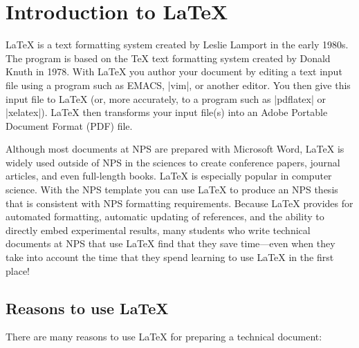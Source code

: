 \chapter{Introduction to \LaTeX}

\LaTeX{} is a text formatting system created by Leslie Lamport in the early
1980s\cite{latex}. The program is based on the \TeX{} text formatting system
created by Donald Knuth in 1978\cite{tex}. 
With \LaTeX{} you author your document
by editing a text input file using a program such as EMACS, |vim|, or another
editor. You then give this input file to \LaTeX{} (or, more accurately, to a
program such as |pdflatex| or |xelatex|). \LaTeX{} then transforms your input
file(s) into an Adobe Portable Document Format (PDF) file.

Although most documents at NPS are prepared with Microsoft\textregistered{}
Word, \LaTeX{} is widely used outside of NPS in the sciences to create
conference papers, journal articles, and even full-length books. \LaTeX{} is
especially popular in computer science. With the NPS template you can use
\LaTeX{} to produce an NPS thesis that is consistent with NPS formatting
requirements. Because \LaTeX{} provides for automated formatting, automatic
updating of references, and the ability to directly embed experimental results,
many students who write technical documents at NPS that use \LaTeX{} find that
they save time---even when they take into account the time that they spend
learning to use \LaTeX{} in the first place!

\section{Reasons to use \LaTeX{}}

There are many reasons to use \LaTeX{} for preparing a technical document:

